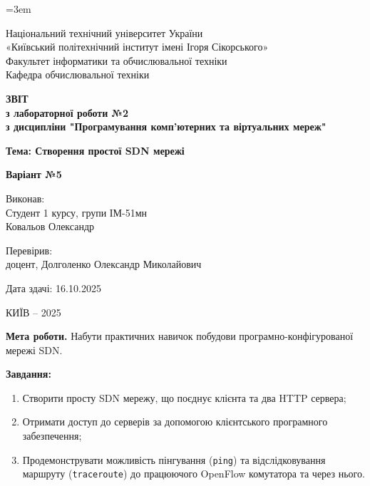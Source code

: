 \documentclass[14pt, a4paper]{extreport}
\newcommand{\CourseTitle}{Програмування комп'ютерних та віртуальних мереж}
\newcommand{\Variant}{5}
\newcommand{\StudentGroup}{ІМ-51мн}
\newcommand{\CourseNumber}{1}
\newcommand{\StudentName}{Ковальов Олександр}
\newcommand{\Teacher}{доцент, Долголенко Олександр Миколайович}
\newcommand{\Year}{2025}
\newcommand{\LabNumber}{2}
\newcommand{\Topic}{Створення простої SDN мережі}
\newcommand{\SubmissionDate}{16.10.2025}
\begin{document}
	\emergencystretch=3em
	
	\begin{titlepage}
		\begin{center}
			{Національний технічний університет України\\
				«Київський політехнічний інститут імені Ігоря Сікорського» \\[1.0em] }
			{Факультет інформатики та обчислювальної техніки\\}
			{Кафедра обчислювальної техніки \\[5.0em]}
			
			{\textbf{ЗВІТ}\\[1em]}
			{\textbf{з лабораторної роботи №\LabNumber} \\}
			{\textbf{з дисципліни "\CourseTitle"} \\[2.0em]}
			
			{\textbf{Тема: \Topic} \\[2.0em]}
			
			{\textbf{Варіант №\Variant} \\[5.0em]}
			
			\begin{flushright}
				Виконав: \\
				Студент \CourseNumber{} курсу, групи \StudentGroup \\
				\StudentName \\[2.0em]
			\end{flushright}
			
			\begin{flushright}
				Перевірив: \\
				\Teacher \\[2.0em]
			\end{flushright}
			
			\begin{flushright}
				Дата здачі: \SubmissionDate \\[5.0em]
			\end{flushright}
		
			\vfill
			КИЇВ -- \Year
		\end{center}
	\end{titlepage}
	
	\setlength{\parindent}{1.25cm}
	
	\textbf{Мета роботи.} Набути практичних навичок побудови програмно-конфігурованої мережі SDN.
	
	\textbf{Завдання:}
	\begin{enumerate}
		\item Створити просту SDN мережу, що поєднує клієнта та два HTTP сервера;
		\item Отримати доступ до серверів за допомогою клієнтського програмного забезпечення;
		\item Продемонструвати можливість пінгування (\texttt{ping}) та відслідковування маршруту (\texttt{traceroute}) до працюючого OpenFlow комутатора та через нього.
	\end{enumerate}
	
\end{document}
